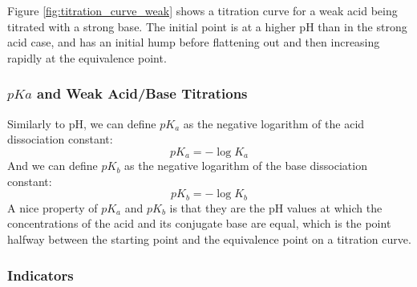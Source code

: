 Figure \ref{fig:titration_curve_weak} shows a titration curve for a weak acid being titrated with a strong base. The initial point is at a higher pH than in the strong acid case, and has an initial hump before flattening out and then increasing rapidly at the equivalence point. 

\subsubsection{$pKa$ and Weak Acid/Base Titrations}

Similarly to pH, we can define $pK_a$ as the negative logarithm of the acid dissociation constant:
\begin{equation}\label{eq:pKa}
    pK_a = -\log K_a
\end{equation}
And we can define $pK_b$ as the negative logarithm of the base dissociation constant:
\begin{equation}\label{eq:pKb}
    pK_b = -\log K_b
\end{equation}
A nice property of $pK_a$ and $pK_b$ is that they are the pH values at which the concentrations of the acid and its conjugate base are equal, which is the point halfway between the starting point and the equivalence point on a titration curve. 

\subsubsection{Indicators}

